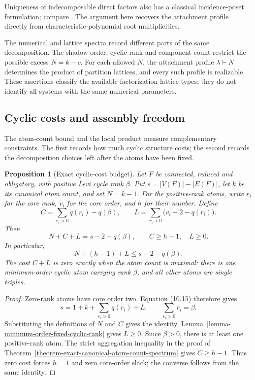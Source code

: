 \documentclass[a4paper,11pt,reqno]{amsart}
\theoremstyle{plain}
\newtheorem{proposition}[theorem]{Proposition}
\theoremstyle{definition}
\theoremstyle{remark}
\begin{document}
Uniqueness of indecomposable direct factors also has a classical incidence-poset
formulation; compare \citet[Lemma~6.1]{schmitt1994}.  The argument here recovers
the attachment profile directly from characteristic-polynomial root multiplicities.

The numerical and lattice spectra record different parts of the same
decomposition.  The shadow order, cyclic rank and component count restrict
the possible excess $N=k-c$.  For each allowed $N$, the attachment profile
$\lambda\vdash N$ determines the product of partition lattices, and every
such profile is realizable.  These assertions classify the available
factorization-lattice types; they do not identify all systems with the same
numerical parameters.

\subsection{Cyclic costs and assembly freedom}
\label{cyclic-costs-and-assembly-freedom}

The atom-count bound and the local product measure complementary constraints.
The first records how much cyclic structure costs; the second records the
decomposition choices left after the atoms have been fixed.

\begin{proposition}[Exact cyclic-cost budget]
\label{proposition-cyclic-cost-budget}
Let $F$ be connected, reduced and obligatory, with positive Levi cycle rank
$\beta$.  Put $s=|V(F)|-|E(F)|$, let $k$ be its canonical atom count, and
set $N=k-1$.  For the positive-rank atoms, write $r_i$ for the core rank,
$v_i$ for the core order, and $h$ for their number.  Define
\[
 C=\sum_{r_i>0}q(r_i)-q(\beta),
 \qquad
 L=\sum_{r_i>0}\bigl(v_i-2-q(r_i)\bigr).
\]
Then
\[
 N+C+L=s-2-q(\beta),
 \qquad C\ge h-1,\quad L\ge0.
\]
In particular,
\[
 N+(h-1)+L\le s-2-q(\beta).
\]
The cost $C+L$ is zero exactly when the atom count is maximal: there is one
minimum-order cyclic atom carrying rank $\beta$, and all other atoms are
single triples.
\end{proposition}
\begin{proof}
Zero-rank atoms have core order two.  Equation (10.15) therefore gives
\[
 s=1+k+\sum_{r_i>0}q(r_i)+L,
 \qquad \sum_{r_i>0}r_i=\beta.
\]
Substituting the definitions of $N$ and $C$ gives the identity.
Lemma~\ref{lemma-minimum-order-fixed-cyclic-rank} gives $L\ge0$.
Since $\beta>0$, there is at least one positive-rank atom.  The strict
aggregation inequality in the proof of
Theorem~\ref{theorem-exact-canonical-atom-count-spectrum} gives $C\ge h-1$.
Thus zero cost forces $h=1$ and zero core-order slack; the converse follows
from the same identity.
\end{proof}
\end{document}
